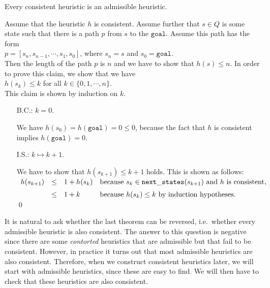 \begin{Theorem}
  Every consistent heuristic is an admissible heuristic.
\end{Theorem}

\proof
Assume that the heuristic $h$ is consistent.  Assume further that $s \in Q$ is some state such that there is a
path $p$ from $s$ to the $\texttt{goal}$.  Assume this path has the form
\\[0.2cm]
\hspace*{1.3cm}
$p = [s_n, s_{n-1}, \cdots, s_1, s_0]$, \quad where $s_n = s$ and $s_0 = \mathtt{goal}$.
\\[0.2cm]
Then the length of the path $p$ is $n$ and we have to show that $h(s) \leq n$.  In order to prove this claim, we show
that we have
\\[0.2cm]
\hspace*{1.3cm}
$h(s_k) \leq k$ \quad for all $k \in \{0, 1, \cdots, n\}$.
\\[0.2cm]
This claim is shown by induction on $k$.
\begin{enumerate}
\item[B.C.:] $k=0$.

             We have $h(s_0) = h(\mathtt{goal}) = 0 \leq 0$, because the fact that $h$ is consistent implies
             $h(\mathtt{goal}) = 0$.
\item[I.S.:] $k \mapsto k+1$.

             We have to show that $h(s_{k+1}) \leq k + 1$ holds.  This is shown as follows:
             \\[0.2cm]
             \hspace*{1.3cm}
             $
             \begin{array}[b]{lcll}
               h(s_{k+1}) & \leq & 1 + h(s_k) & \mbox{because $s_k \in \mathtt{next\_states}(s_{k+1})$ and $h$ is consistent,} \\[0.2cm]
                         & \leq & 1 + k      & \mbox{because $h(s_k) \leq k$ by induction hypotheses.} 
             \end{array}
             $ 
             \qed
\end{enumerate}

It is natural to ask whether the last theorem can be reversed, i.e.~whether every admissible heuristic is also
consistent.  The answer to this question is negative since there are
some \emph{\color{red}contorted} heuristics that are admissible but that fail to be consistent.  However, in
practice it turns out that most 
admissible heuristics are also consistent.  Therefore, when we construct consistent heuristics later, we will
start with admissible heuristics, since these are easy to find.  We will then have to check that these
heuristics are also consistent.

